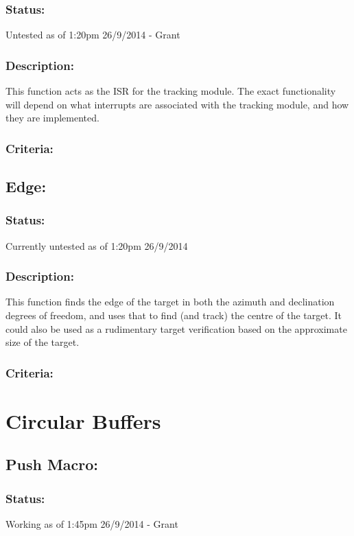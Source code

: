 \documentclass[]{report}
\begin{document}
\subsubsection{Status:}
Untested as of 1:20pm 26/9/2014 - Grant

\subsubsection{Description:}
This function acts as the ISR for the tracking module. The exact functionality will depend on what interrupts are associated with the tracking module, and how they are implemented.

\subsubsection{Criteria:}


\subsection{Edge:}
\subsubsection{Status:}
Currently untested as of 1:20pm 26/9/2014

\subsubsection{Description:}
This function finds the edge of the target in both the azimuth and declination degrees of freedom, and uses that to find (and track) the centre of the target. It could also be used as a rudimentary target verification based on the approximate size of the target.

\subsubsection{Criteria:}

\newpage
\section{Circular Buffers}
\subsection{Push Macro:}
\subsubsection{Status:}
Working as of 1:45pm 26/9/2014 - Grant
\end{document}
